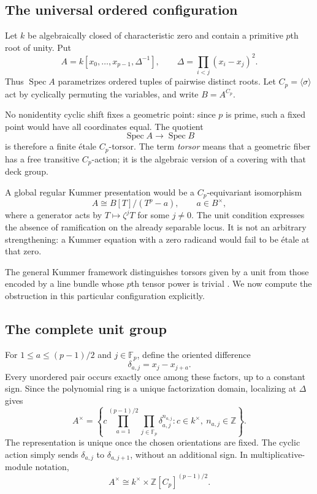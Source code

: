 \documentclass[11pt,a4paper]{article}
\theoremstyle{definition}
\theoremstyle{remark}
\newcommand{\Z}{\mathbb Z}
\newcommand{\F}{\mathbb F}
\newcommand{\Spec}{\operatorname{Spec}}
\begin{document}
\subsection{The universal ordered configuration}

Let $k$ be algebraically closed of characteristic zero and contain a
primitive $p$th root of unity. Put
\begin{equation}
 A=k[x_0,\ldots,x_{p-1},\Delta^{-1}],\qquad
 \Delta=\prod_{i<j}(x_i-x_j)^2.
 \label{rss:eq:configuration}
\end{equation}
Thus $\Spec A$ parametrizes ordered tuples of pairwise distinct roots.
Let $C_p=\langle\sigma\rangle$ act by cyclically permuting the variables,
and write $B=A^{C_p}$.

No nonidentity cyclic shift fixes a geometric point: since $p$ is prime,
such a fixed point would have all coordinates equal. The quotient
\[
 \Spec A\longrightarrow\Spec B
\]
is therefore a finite \'etale $C_p$-torsor. The term \emph{torsor} means that
a geometric fiber has a free transitive $C_p$-action; it is the algebraic
version of a covering with that deck group.

A global regular Kummer presentation would be a $C_p$-equivariant
isomorphism
\begin{equation}
 A\cong B[T]/(T^p-a),\qquad a\in B^\times,
 \label{rss:eq:globalKummer}
\end{equation}
where a generator acts by $T\mapsto\zeta^jT$ for some $j\neq0$.
The unit condition expresses the absence of ramification on the already
separable locus. It is not an arbitrary strengthening: a Kummer equation
with a zero radicand would fail to be \'etale at that zero.

The general Kummer framework distinguishes torsors given by a unit from
those encoded by a line bundle whose $p$th tensor power is trivial
\cite{StacksKummer}. We now compute the obstruction in this particular
configuration explicitly.

\subsection{The complete unit group}

For $1\leq a\leq(p-1)/2$ and $j\in\F_p$, define the oriented difference
\[
 \delta_{a,j}=x_j-x_{j+a}.
\]
Every unordered pair occurs exactly once among these factors, up to a
constant sign. Since the polynomial ring is a unique factorization domain,
localizing at $\Delta$ gives
\begin{equation}
 A^\times=
 \left\{c\prod_{a=1}^{(p-1)/2}\prod_{j\in\F_p}
          \delta_{a,j}^{n_{a,j}}:
       c\in k^\times,\ n_{a,j}\in\Z\right\}.
 \label{rss:eq:units}
\end{equation}
The representation is unique once the chosen orientations are fixed.
The cyclic action simply sends $\delta_{a,j}$ to $\delta_{a,j+1}$, without
an additional sign. In multiplicative-module notation,
\begin{equation}
 A^\times\cong k^\times\times
                \Z[C_p]^{(p-1)/2}.
 \label{rss:eq:unitmodule}
\end{equation}
\end{document}
